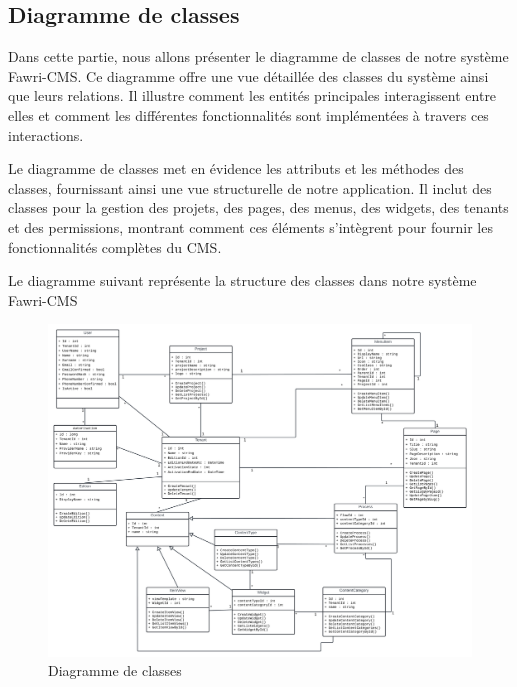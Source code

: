 \subsection{Diagramme de classes}
\hspace{\parindent}Dans cette partie, nous allons présenter le diagramme de classes de notre système Fawri-CMS. Ce diagramme offre une vue détaillée des classes du système ainsi que leurs relations. Il illustre comment les entités principales interagissent entre elles et comment les différentes fonctionnalités sont implémentées à travers ces interactions.

Le diagramme de classes met en évidence les attributs et les méthodes des classes, fournissant ainsi une vue structurelle de notre application. Il inclut des classes pour la gestion des projets, des pages, des menus, des widgets, des tenants et des permissions, montrant comment ces éléments s'intègrent pour fournir les fonctionnalités complètes du CMS.

Le diagramme suivant représente la structure des classes dans notre système Fawri-CMS



\begin{figure}[H]
  \centering
  \includegraphics[width=17cm]{Figures/diag de classe.png}
  \caption{Diagramme de classes}
\end{figure}





